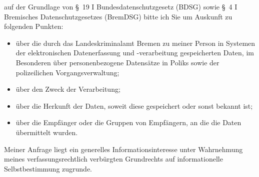 auf der Grundlage von §~19 I Bundesdatenschutzgesetz (BDSG) sowie
§~4 I Bremisches Datenschutzgesetzes (BremDSG) bitte ich Sie um Auskunft zu
folgenden Punkten:

\begin{itemize}
  \item über die durch das Landeskriminalamt Bremen zu meiner Person in Systemen
  der elektronischen Datenerfassung und -verarbeitung gespeicherten Daten, im
  Besonderen über personenbezogene Datensätze in Poliks sowie der polizeilichen
  Vorgangsverwaltung;

  \item über den Zweck der Verarbeitung;

  \item über die Herkunft der Daten, soweit diese gespeichert oder sonst bekannt ist;

  \item über die Empfänger oder die Gruppen von Empfängern, an die die Daten übermittelt wurden.
\end{itemize}

Meiner Anfrage liegt ein generelles Informationsinteresse unter Wahrnehmung
meines verfassungsrechtlich verbürgten Grundrechts auf informationelle
Selbstbestimmung zugrunde.

